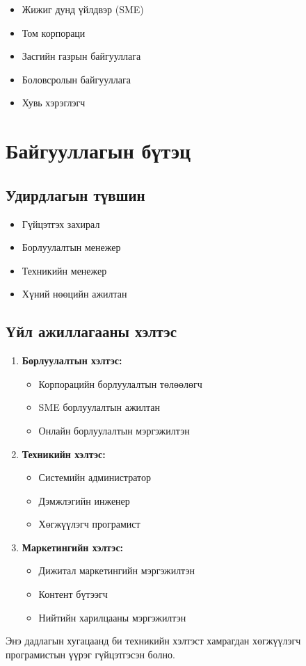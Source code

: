 \documentclass[main.tex]{subfiles}
\begin{document}
\begin{itemize}
    \item Жижиг дунд үйлдвэр (SME)
    \item Том корпораци
    \item Засгийн газрын байгууллага
    \item Боловсролын байгууллага
    \item Хувь хэрэглэгч
\end{itemize}

\section{Байгууллагын бүтэц}

\subsection{Удирдлагын түвшин}
\begin{itemize}
    \item Гүйцэтгэх захирал
    \item Борлуулалтын менежер
    \item Техникийн менежер
    \item Хүний нөөцийн ажилтан
\end{itemize}

\subsection{Үйл ажиллагааны хэлтэс}

\begin{enumerate}
    \item \textbf{Борлуулалтын хэлтэс:}
    \begin{itemize}
        \item Корпорацийн борлуулалтын төлөөлөгч
        \item SME борлуулалтын ажилтан
        \item Онлайн борлуулалтын мэргэжилтэн
    \end{itemize}
    
    \item \textbf{Техникийн хэлтэс:}
    \begin{itemize}
        \item Системийн администратор
        \item Дэмжлэгийн инженер
        \item Хөгжүүлэгч програмист
    \end{itemize}
    
    \item \textbf{Маркетингийн хэлтэс:}
    \begin{itemize}
        \item Дижитал маркетингийн мэргэжилтэн
        \item Контент бүтээгч
        \item Нийтийн харилцааны мэргэжилтэн
    \end{itemize}
\end{enumerate}

Энэ дадлагын хугацаанд би техникийн хэлтэст хамрагдан хөгжүүлэгч програмистын үүрэг гүйцэтгэсэн болно.
\end{document}
